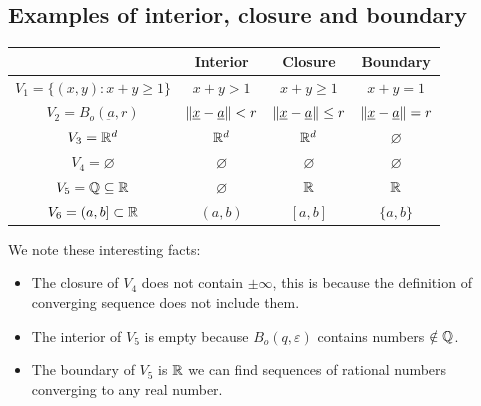 \documentclass[10pt]{extarticle}
\renewcommand{\vec}[1]{\underbar{\ensuremath{#1}}}
\begin{document}
                \subsection{Examples of interior, closure and boundary}

                \begin{center}
                    \begin{tabular}{ |c|c|c|c| }
                        \hline
                                                            & Interior                       & Closure                           & Boundary                       \\
                        \hline
                        $V_1 = \{ (x, y) : x + y \geq 1 \}$ & $x + y > 1$                    & $x + y \geq 1$                    & $x + y = 1$                    \\
                        $V_2 = B_o(\vec{a}, r)$             & $\norm{\vec{x} - \vec{a}} < r$ & $\norm{\vec{x} - \vec{a}} \leq r$ & $\norm{\vec{x} - \vec{a}} = r$ \\
                        $V_3 = \mathbb{R}^d$                        & $\mathbb{R}^d$                         & $\mathbb{R}^d$                            & $\varnothing$                  \\
                        $V_4 = \varnothing$                 & $\varnothing$                  & $\varnothing$                     & $\varnothing$                  \\
                        $V_5 = \mathbb{Q} \subseteq \mathbb{R}$             & $\varnothing$                  & $\mathbb{R}$                              & $\mathbb{R}$                           \\
                        $V_6 = (a, b] \subset \mathbb{R}$           & $(a, b)$                       & $[a, b]$                          & $\{a, b\}$                     \\
                        \hline
                    \end{tabular}
                \end{center}

                We note these interesting facts:
                \begin{itemize}
                    \item The closure of $V_4$ does not contain $\pm \infty$, this is because the definition of converging sequence does not include them.
                    \item The interior of $V_5$ is empty because $B_o(q, \varepsilon)$ contains numbers $\notin \mathbb{Q}$.
                    \item The boundary of $V_5$ is $\mathbb{R}$ we can find sequences of rational numbers converging to any real number.
                \end{itemize}
\end{document}

